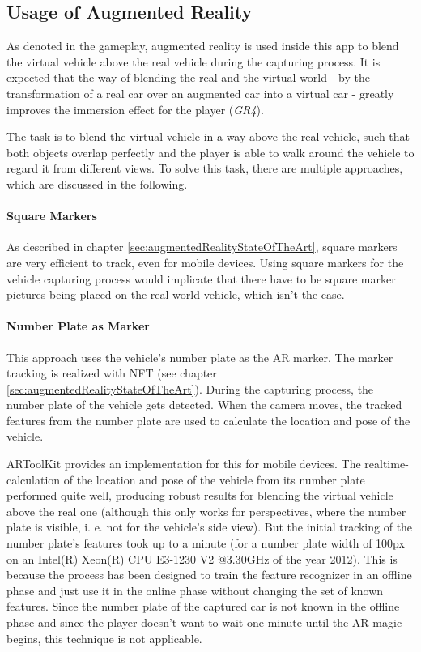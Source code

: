 \subsection{Usage of Augmented Reality}\label{sec:usageOfAR}
As denoted in the gameplay, augmented reality is used inside this app to blend the virtual vehicle above the real vehicle during the capturing process. It is expected that the way of blending the real and the virtual world - by the transformation of a real car over an augmented car into a virtual car - greatly improves the immersion effect for the player (\emph{GR4}).

The task is to blend the virtual vehicle in a way above the real vehicle, such that both objects overlap perfectly and the player is able to walk around the vehicle to regard it from different views. To solve this task, there are multiple approaches, which are discussed in the following.

\paragraph{Square Markers}
As described in chapter \ref{sec:augmentedRealityStateOfTheArt}, square markers are very efficient to track, even for mobile devices. Using square markers for the vehicle capturing process would implicate that there have to be square marker pictures being placed on the real-world vehicle, which isn't the case.

\paragraph{Number Plate as Marker}
This approach uses the vehicle's number plate as the AR marker. The marker tracking is realized with NFT (see chapter \ref{sec:augmentedRealityStateOfTheArt}). During the capturing process, the number plate of the vehicle gets detected. When the camera moves, the tracked features from the number plate are used to calculate the location and pose of the vehicle.

ARToolKit provides an implementation for this for mobile devices. The realtime-calculation of the location and pose of the vehicle from its number plate performed quite well, producing robust results for blending the virtual vehicle above the real one (although this only works for perspectives, where the number plate is visible, i. e. not for the vehicle's side view). But the initial tracking of the number plate's features took up to a minute (for a number plate width of 100px on an Intel(R) Xeon(R) CPU E3-1230 V2 @3.30GHz of the year 2012). This is because the process has been designed to train the feature recognizer in an offline phase and just use it in the online phase without changing the set of known features. Since the number plate of the captured car is not known in the offline phase and since the player doesn't want to wait one minute until the AR magic begins, this technique is not applicable.

